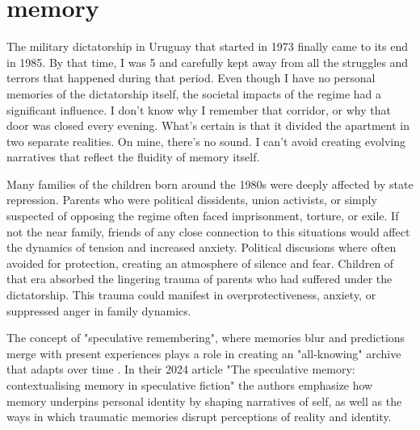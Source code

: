 \chapter*{memory}
\begin{center}
\vspace{2cm}
\begin{flushright}
\large
\end{flushright}
\vspace{2cm}
\end{center}
\normalsize

The military dictatorship in Uruguay that started in 1973 finally came to its end in 1985. By that time, I was 5 and carefully kept away from all the struggles and terrors that happened during that period. Even though I have no personal memories of the dictatorship itself, the societal impacts of the regime had a significant influence. I don't know why I remember that corridor, or why that door was closed every evening. What's certain is that it divided the apartment in two separate realities. On mine, there's no sound. I can't avoid creating evolving narratives that reflect the fluidity of memory itself. 

Many families of the children born around the 1980s were deeply affected by state repression. Parents who were political dissidents, union activists, or simply suspected of opposing the regime often faced imprisonment, torture, or exile. If not the near family, friends of any close connection to this situations would affect the dynamics of tension and increased anxiety. Political discusions where often avoided for protection, creating an atmosphere of silence and fear. Children of that era absorbed the lingering trauma of parents who had suffered under the dictatorship. This trauma could manifest in overprotectiveness, anxiety, or suppressed anger in family dynamics.

The concept of "speculative remembering", where memories blur and predictions merge with present experiences plays a role in creating an "all-knowing" archive that adapts over time \citep{dutt2024}. In their 2024 article "The speculative memory: contextualising memory in speculative fiction" the authors emphasize how memory underpins personal identity by shaping narratives of self, as well as the ways in which traumatic memories disrupt perceptions of reality and identity.  


